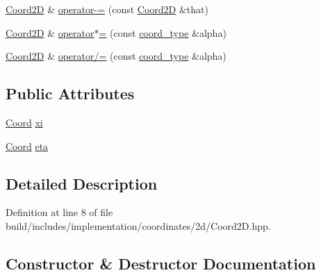 \begin{DoxyCompactItemize}
\item 
\hyperlink{classMcCAD_1_1Geometry_1_1Coord2D}{Coord2D} \& \hyperlink{classMcCAD_1_1Geometry_1_1Coord2D_ae45976df702cd27e38cb8ed1e54611e9}{operator-\/=} (const \hyperlink{classMcCAD_1_1Geometry_1_1Coord2D}{Coord2D} \&that)
\item 
\hyperlink{classMcCAD_1_1Geometry_1_1Coord2D}{Coord2D} \& \hyperlink{classMcCAD_1_1Geometry_1_1Coord2D_a55b64bd56f217b3bf2a100a75b9ef605}{operator$\ast$=} (const \hyperlink{namespaceMcCAD_1_1Geometry_ac043b37a4a7e849fca22869e1982d2f8}{coord\+\_\+type} \&alpha)
\item 
\hyperlink{classMcCAD_1_1Geometry_1_1Coord2D}{Coord2D} \& \hyperlink{classMcCAD_1_1Geometry_1_1Coord2D_a30849806186f3b496b03c34c3c2142ad}{operator/=} (const \hyperlink{namespaceMcCAD_1_1Geometry_ac043b37a4a7e849fca22869e1982d2f8}{coord\+\_\+type} \&alpha)
\end{DoxyCompactItemize}
\subsection*{Public Attributes}
\begin{DoxyCompactItemize}
\item 
\hyperlink{classMcCAD_1_1Geometry_1_1Coord}{Coord} \hyperlink{classMcCAD_1_1Geometry_1_1Coord2D_a5b99b9ce570b6bd792bd485fb2f305bb}{xi}
\item 
\hyperlink{classMcCAD_1_1Geometry_1_1Coord}{Coord} \hyperlink{classMcCAD_1_1Geometry_1_1Coord2D_afa71c0967f3d43fe50e61abd731c8f5e}{eta}
\end{DoxyCompactItemize}


\subsection{Detailed Description}


Definition at line 8 of file build/includes/implementation/coordinates/2d/\+Coord2\+D.\+hpp.



\subsection{Constructor \& Destructor Documentation}
\mbox{\label{classMcCAD_1_1Geometry_1_1Coord2D_afae68072cfee4a541122ef0c63c7352c}} 
